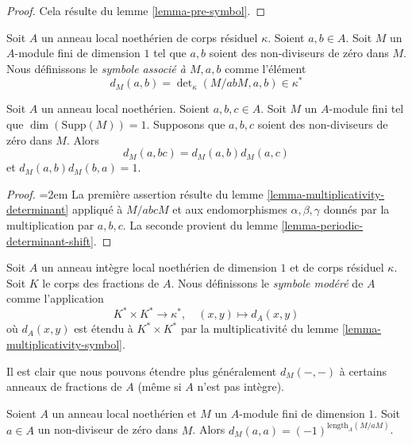 \begin{proof}
Cela résulte du lemme \ref{lemma-pre-symbol}.
\end{proof}

\begin{definition}
\label{definition-symbol-M}
Soit $A$ un anneau local noethérien de corps résiduel $\kappa$.
Soient $a, b \in A$.
Soit $M$ un $A$-module fini de dimension $1$
tel que $a, b$ soient des non-diviseurs de zéro dans $M$.
Nous définissons le {\it symbole associé à $M, a, b$}
comme l'élément
$$
d_M(a, b) =
\det\nolimits_\kappa(M/abM, a, b) \in \kappa^*
$$
\end{definition}

\begin{lemma}
\label{lemma-multiplicativity-symbol}
Soit $A$ un anneau local noethérien.
Soient $a, b, c \in A$. Soit $M$ un $A$-module fini
tel que $\dim(\text{Supp}(M)) = 1$. Supposons que $a, b, c$ soient des non-diviseurs de zéro dans $M$.
Alors
$$
d_M(a, bc) = d_M(a, b) d_M(a, c)
$$
et $d_M(a, b)d_M(b, a) = 1$.
\end{lemma}

\begin{proof}
{\emergencystretch=2em La première assertion résulte du lemme \ref{lemma-multiplicativity-determinant}
appliqué à $M/abcM$ et aux endomorphismes $\alpha, \beta, \gamma$ donnés par
la multiplication par $a, b, c$.
La seconde provient du lemme \ref{lemma-periodic-determinant-shift}.\par}
\end{proof}

\begin{definition}
\label{definition-tame-symbol}
Soit $A$ un anneau intègre local noethérien de dimension $1$
et de corps résiduel $\kappa$.
Soit $K$ le corps des fractions de $A$.
Nous définissons le {\it symbole modéré} de $A$ comme l'application
$$
K^* \times K^* \longrightarrow \kappa^*,
\quad
(x, y) \longmapsto d_A(x, y)
$$
où $d_A(x, y)$ est étendu à $K^* \times K^*$ par la multiplicativité du
lemme \ref{lemma-multiplicativity-symbol}.
\end{definition}

\noindent
Il est clair que nous pouvons étendre plus généralement $d_M(-, -)$ à
certains anneaux de fractions de $A$ (même si $A$ n'est pas intègre).

\begin{lemma}
\label{lemma-symbol-when-equal}
Soient $A$ un anneau local noethérien et $M$ un $A$-module fini de
dimension $1$. Soit $a \in A$ un non-diviseur de zéro dans $M$.
Alors $d_M(a, a) = (-1)^{\text{length}_A(M/aM)}$.
\end{lemma}

